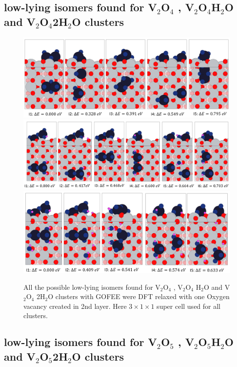 \documentclass[aip,amsmath,amssymb,reprint, jcp]{revtex4-1}
\begin{document}
\subsection{low-lying isomers found for V$_2$O$_4$ , V$_2$O$_4$H$_2$O and V$_2$O$_4$2H$_2$O clusters}

\begin{figure}
\centering
\includegraphics[width=1.0\textwidth]{V2O4_TiO2_101sur_3by1supercell.png}
\includegraphics[width=1.0\textwidth]{V2O4_H2O_TiO2_101sur_3by1supercell.png}
\includegraphics[width=1.0\textwidth]{V2O4_2H2O_TiO2_101sur_3by1supercell.png}
\caption{All the possible low-lying isomers found for V$_2$O$_4$  , V$_2$O$_4$ H$_2$O and V$_2$O$_4$ 2H$_2$O clusters with GOFEE were DFT relaxed with one Oxygen vacancy created in 2nd layer. Here $3 \times 1 \times 1$ super cell used for all clusters.}
\label{fig:exptobser}
\end{figure}

\subsection{low-lying isomers found for V$_2$O$_5$ , V$_2$O$_5$H$_2$O and V$_2$O$_5$2H$_2$O clusters}
\end{document}
